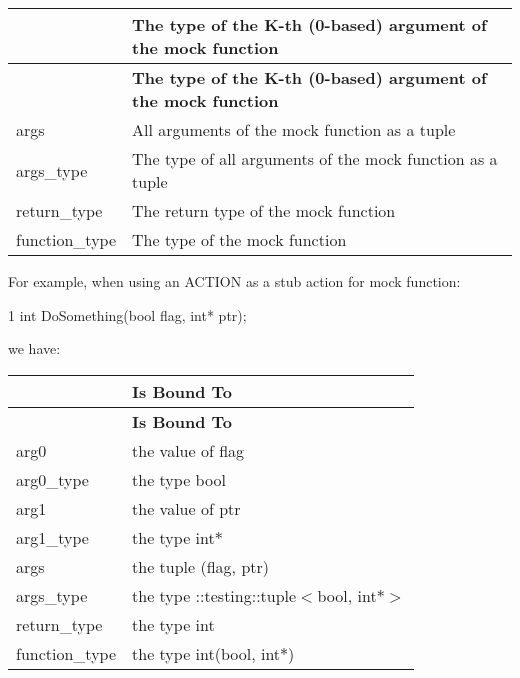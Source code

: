 \tabulinesep=1mm
\begin{longtabu} spread 0pt [c]{*2{|X[-1]}|}
\hline
{}&{\bf The type of the K-\/th (0-\/based) argument of the mock function  }\\
\endfirsthead
\hline
\endfoot
\hline
{}&{\bf The type of the K-\/th (0-\/based) argument of the mock function  }\\
\endhead
{\ttfamily args} &All arguments of the mock function as a tuple \\
{\ttfamily args\+\_\+type} &The type of all arguments of the mock function as a tuple \\
{\ttfamily return\+\_\+type} &The return type of the mock function \\
{\ttfamily function\+\_\+type} &The type of the mock function \\
\end{longtabu}
For example, when using an {\ttfamily A\+C\+T\+I\+ON} as a stub action for mock function\+: 
\begin{DoxyCode}
1 int DoSomething(bool flag, int* ptr);
\end{DoxyCode}
 we have\+: \tabulinesep=1mm
\begin{longtabu} spread 0pt [c]{*2{|X[-1]}|}
\hline
{}&{\bf {\bfseries Is Bound To}  }\\
\endfirsthead
\hline
\endfoot
\hline
{}&{\bf {\bfseries Is Bound To}  }\\
\endhead
{\ttfamily arg0} &the value of {\ttfamily flag} \\
{\ttfamily arg0\+\_\+type} &the type {\ttfamily bool} \\
{\ttfamily arg1} &the value of {\ttfamily ptr} \\
{\ttfamily arg1\+\_\+type} &the type {\ttfamily int$\ast$} \\
{\ttfamily args} &the tuple {\ttfamily (flag, ptr)} \\
{\ttfamily args\+\_\+type} &the type {\ttfamily \+::testing\+::tuple$<$bool, int$\ast$$>$} \\
{\ttfamily return\+\_\+type} &the type {\ttfamily int} \\
{\ttfamily function\+\_\+type} &the type {\ttfamily int(bool, int$\ast$)} \\
\end{longtabu}
